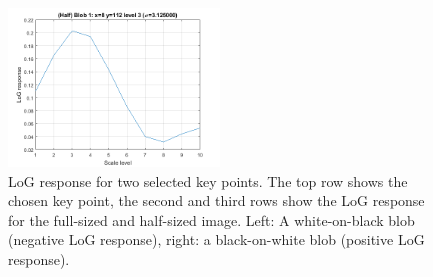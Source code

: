 \begin{figure}[h]
	\includegraphics[width=0.5\textwidth]{figures/a3_butterfly_log_half_2.png}
	\caption{LoG response for two selected key points. The top row shows the chosen key point, the second and third rows show the LoG response for the full-sized and half-sized image. Left: A white-on-black blob (negative LoG response), right: a black-on-white blob (positive LoG response).}
	\label{fig:a3:logresponse}
\end{figure}

